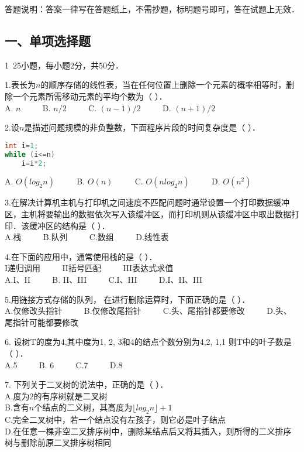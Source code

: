 

答题说明：答案一律写在答题纸上，不需抄题，标明题号即可，答在试题上无效．

\subsection{一、单项选择题}

1~25小题，每小题2分，共50分．

1.表长为$n$的顺序存储的线性表，当在任何位置上删除一个元素的概率相等时，删除一个元素所需移动元素的平均个数为（    ）． \\
A. $n$ $\qquad$ B. $n/2$ $\qquad$ C. $(n-1)/2$ $\qquad$ D. $(n+1)/2$

2.设$n$是描述问题规模的非负整数，下面程序片段的时间复杂度是（    ）． \\
\begin{lstlisting}[language=cpp]
int i=1;
while (i<=n)
    i=i*2;
\end{lstlisting}
A. $O(log_2n)$  $\qquad$  B. $O(n)$  $\qquad$  C. $O(nlog_2n)$  $\qquad$  D. $O(n^2)$

3.在解决计算机主机与打印机之间速度不匹配问题时通常设置一个打印数据缓冲区，主机将要输出的数据依次写入该缓冲区，而打印机则从该缓冲区中取出数据打印．该缓冲区的结构是（    ）． \\
A.栈 $\qquad$ B.队列 $\qquad$ C.数组 $\qquad$ D.线性表

4.在下面的应用中，通常使用栈的是（    ）． \\
I递归调用 $\qquad$ II括号匹配 $\qquad$ III表达式求值 $\qquad$ \\
A.I、II $\qquad$ B. II、III $\qquad$ C.I、III $\qquad$ D.I、II、III

5.用链接方式存储的队列， 在进行删除运算时，下面正确的是（    ）． \\
A.仅修改头指针 $\qquad$ B.仅修改尾指针 $\qquad$ C.头、尾指针都要修改 $\qquad$ D.头、尾指针可能都要修改

6. 设树T的度为4,其中度为1, 2, 3和4的结点个数分别为4,2, 1,1 则T中的叶子数是（    ）． \\
A.5 $\qquad$ B. 6 $\qquad$ C.7 $\qquad$ D.8

7. 下列关于二叉树的说法中，正确的是（    ）． \\
A.度为$2$的有序树就是二叉树 \\
B.含有$n$个结点的二义树，其高度为$\lfloor log_2n \rfloor +1$ \\
C.完全二叉树中，若一个结点没有左孩子，则它必是叶子结点 \\
D.在任意一棵非空二叉排序树中，删除某结点后又将其插入，则所得的二义排序树与删除前原二叉排序树相同

